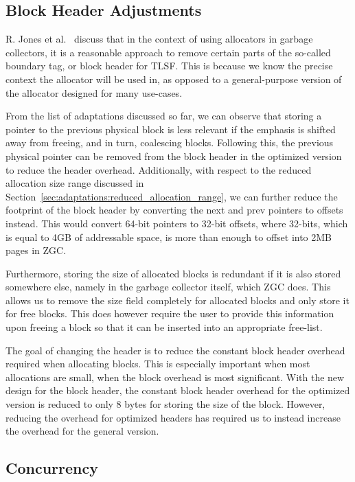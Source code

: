 \subsection{Block Header Adjustments}
\label{sec:adaptations:block-header-adjustments}

R. Jones et al.~\cite[Page 103]{gchandbook} discuss that in the context of using allocators in garbage collectors, it is a reasonable approach to remove certain parts of the so-called boundary tag, or block header for TLSF. This is because we know the precise context the allocator will be used in, as opposed to a general-purpose version of the allocator designed for many use-cases.

From the list of adaptations discussed so far, we can observe that storing a pointer to the previous physical block is less relevant if the emphasis is shifted away from freeing, and in turn, coalescing blocks. Following this, the previous physical pointer can be removed from the block header in the optimized version to reduce the header overhead. Additionally, with respect to the reduced allocation size range discussed in Section~\ref{sec:adaptations:reduced_allocation_range}, we can further reduce the footprint of the block header by converting the next and prev pointers to offsets instead. This would convert 64-bit pointers to 32-bit offsets, where 32-bits, which is equal to 4GB of addressable space, is more than enough to offset into 2MB pages in ZGC.

Furthermore, storing the size of allocated blocks is redundant if it is also stored somewhere else, namely in the garbage collector itself, which ZGC does. This allows us to remove the size field completely for allocated blocks and only store it for free blocks. This does however require the user to provide this information upon freeing a block so that it can be inserted into an appropriate free-list.

The goal of changing the header is to reduce the constant block header overhead required when allocating blocks. This is especially important when most allocations are small, when the block overhead is most significant. With the new design for the block header, the constant block header overhead for the optimized version is reduced to only 8 bytes for storing the size of the block. However, reducing the overhead for optimized headers has required us to instead increase the overhead for the general version.

\subsection{Concurrency}

